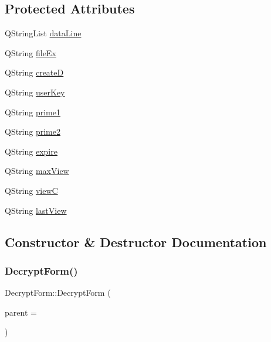 \subsection*{Protected Attributes}
\begin{DoxyCompactItemize}
\item 
Q\+String\+List \hyperlink{class_decrypt_form_a16c208fef98e40521b962932602ce0ff}{data\+Line}
\item 
Q\+String \hyperlink{class_decrypt_form_a948100789ce9a1613fc4e028609d7f7d}{file\+Ex}
\item 
Q\+String \hyperlink{class_decrypt_form_af0a16237e0a531f3167acd67eae7e69b}{createD}
\item 
Q\+String \hyperlink{class_decrypt_form_a9b9b4da9c4713812a4ef07e8e60dd25a}{user\+Key}
\item 
Q\+String \hyperlink{class_decrypt_form_a2a575d06f53701521157379069b573f0}{prime1}
\item 
Q\+String \hyperlink{class_decrypt_form_ac9b5eaa528b2826f3926e410e6ffa967}{prime2}
\item 
Q\+String \hyperlink{class_decrypt_form_ac0a3281de07c0e2b461652ce12b1ada2}{expire}
\item 
Q\+String \hyperlink{class_decrypt_form_ada58fe6ec6a6c8204e30dfdbb9e55bbe}{max\+View}
\item 
Q\+String \hyperlink{class_decrypt_form_a6363fdac4c8f9ebbdc902f1b8e3686a3}{viewC}
\item 
Q\+String \hyperlink{class_decrypt_form_a64370269794155fc85fafa42a1d31913}{last\+View}
\end{DoxyCompactItemize}


\subsection{Constructor \& Destructor Documentation}
\hypertarget{class_decrypt_form_adedf517dfb4bb9411c4caf92943e7033}{}\label{class_decrypt_form_adedf517dfb4bb9411c4caf92943e7033} 
\subsubsection{\texorpdfstring{Decrypt\+Form()}{DecryptForm()}}
{\footnotesize\ttfamily Decrypt\+Form\+::\+Decrypt\+Form (\begin{DoxyParamCaption}\item[{Q\+Widget $\ast$}]{parent = {} }\end{DoxyParamCaption})\hspace{0.3cm}{\ttfamily [explicit]}}


